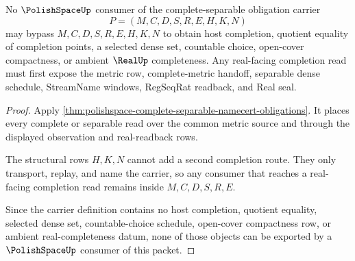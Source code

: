 \begin{theorem}
\label{thm:polishspace-real-completion-readback-nonescape}
No $\PolishSpaceUp$ consumer of the complete-separable obligation carrier
$$
P=(M,C,D,S,R,E,H,K,N)
$$
may bypass $M,C,D,S,R,E,H,K,N$ to obtain host completion, quotient equality of completion points, a selected dense set, countable choice, open-cover compactness, or ambient $\RealUp$ completeness. Any real-facing completion read must first expose the metric row, complete-metric handoff, separable dense schedule, StreamName windows, RegSeqRat readback, and Real seal.
\end{theorem}
\begin{proof}
Apply \autoref{thm:polishspace-complete-separable-namecert-obligations}. It places every complete or separable read over the common metric source and through the displayed observation and real-readback rows.

The structural rows $H,K,N$ cannot add a second completion route. They only transport, replay, and name the carrier, so any consumer that reaches a real-facing completion read remains inside $M,C,D,S,R,E$.

Since the carrier definition contains no host completion, quotient equality, selected dense set, countable-choice schedule, open-cover compactness row, or ambient real-completeness datum, none of those objects can be exported by a $\PolishSpaceUp$ consumer of this packet.
\end{proof}
